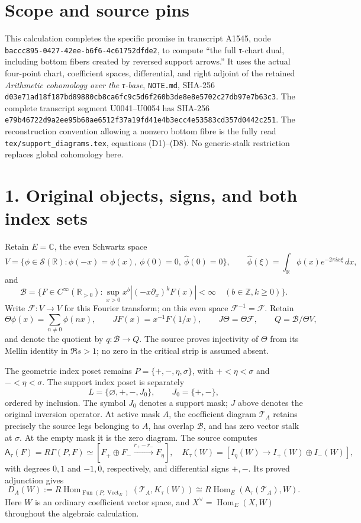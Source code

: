 \section{Scope and source pins}\label{scope-and-source-pins}

This calculation completes the specific promise in transcript A1545,
node \texttt{baccc895-0427-42ee-b6f6-4c61752dfde2}, to compute ``the
full τ-chart dual, including bottom fibers created by reversed support
arrows.'' It uses the actual four-point chart, coefficient spaces,
differential, and right adjoint of the retained \emph{Arithmetic
cohomology over the τ-base}, \texttt{NOTE.md}, SHA-256
\texttt{d03e71ad18f187bd89880cb8ca6fc9c5d6f260b3de8e8e5702c27db97e7b63c3}.
The complete transcript segment U0041--U0054 has SHA-256
\texttt{e79b46722d9a2ee95b68ae6512f37a19fd41e4b3ecc4e53583cd357d0442c251}.
The reconstruction convention allowing a nonzero bottom fibre is the
fully read \texttt{tex/support\_diagrams.tex}, equations (D1)--(D8). No
generic-stalk restriction replaces global cohomology here.

\section{1. Original objects, signs, and both index
sets}\label{original-objects-signs-and-both-index-sets}

Retain \(E=\mathbb C\), the even Schwartz space \[
V=\{\phi\in\mathcal S(\mathbb R):\phi(-x)=\phi(x),\ \phi(0)=0,\ \widehat\phi(0)=0\},
\qquad
\widehat\phi(\xi)=\int_{\mathbb R}\phi(x)e^{-2\pi i x\xi}\,dx,
\] and \[
\mathscr B=\{F\in C^\infty(\mathbb R_{>0}):
\sup_{x>0}x^b|(-x\partial_x)^kF(x)|<\infty\quad(b\in\mathbb Z,k\ge0)\}.
\] Write \(\mathcal F:V\to V\) for this Fourier transform; on this even
space \(\mathcal F^{-1}=\mathcal F\). Retain \[
\Theta\phi(x)=\sum_{n\ne0}\phi(nx),\qquad
JF(x)=x^{-1}F(1/x),\qquad J\Theta=\Theta\mathcal F,
\qquad Q=\mathscr B/\Theta V,
\] and denote the quotient by \(q:\mathscr B\to Q\). The source proves
injectivity of \(\Theta\) from its Mellin identity in \(\Re s>1\); no
zero in the critical strip is assumed absent.

The geometric index poset remains \(P=\{+,-,\eta,\sigma\}\), with
\(+<\eta<\sigma\) and \(-<\eta<\sigma\). The support index poset is
separately \[
L=\{\varnothing,+,-,J_0\},\qquad J_0=\{+,-\},
\] ordered by inclusion. The symbol \(J_0\) denotes a support mask;
\(J\) above denotes the original inversion operator. At active mask
\(A\), the coefficient diagram \(\mathcal T_A\) retains precisely the
source legs belonging to \(A\), has overlap \(\mathscr B\), and has zero
vector stalk at \(\sigma\). At the empty mask it is the zero diagram.
The source computes \[
\mathsf A_\tau(F)=R\Gamma(P,F)
\simeq[F_+\oplus F_-\xrightarrow{r_+-r_-}F_\eta],
\quad
K_\tau(W)=[I_\eta(W)\longrightarrow I_+(W)\oplus I_-(W)],
\] with degrees \(0,1\) and \(-1,0\), respectively, and differential
signs \(+,-\). Its proved adjunction gives \[
D_A(W):=R\operatorname{Hom}_{\operatorname{Fun}(P,\operatorname{Vect}_E)}
(\mathcal T_A,K_\tau(W))
\cong R\operatorname{Hom}_E(\mathsf A_\tau(\mathcal T_A),W).
\] Here \(W\) is an ordinary coefficient vector space, and
\(X^\vee=\operatorname{Hom}_E(X,W)\) throughout the algebraic
calculation.

